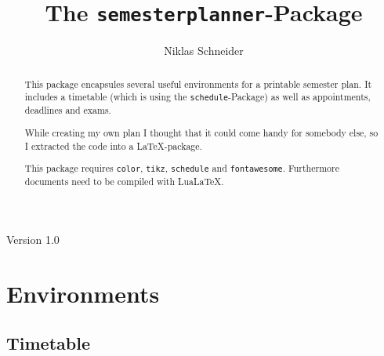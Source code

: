 \documentclass{article}
\title{The \texttt{semesterplanner}-Package}
\author{Niklas Schneider}
\begin{document}
	\maketitle
	\begin{center}
		Version 1.0\\
	\end{center}

	\begin{abstract}
		This package encapsules several useful environments for a printable semester plan. It includes a timetable (which is using the \texttt{schedule}-Package) as well as appointments, deadlines and exams.
		
		While creating my own plan I thought that it could come handy for somebody else, so I extracted the code into a \LaTeX-package.
		
		This package requires \texttt{color}, \texttt{tikz}, \texttt{schedule} and \texttt{fontawesome}. Furthermore documents need to be compiled with LuaLaTeX.
	\end{abstract}

	\tableofcontents
	\pagebreak
	
	\section{Environments}
	\subsection{Timetable}
	\label{timetable}
\end{document}
